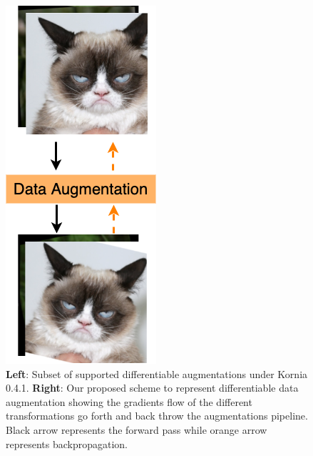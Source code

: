 \begin{figure}
\begin{minipage}[b]{0.25\linewidth}
    \includegraphics[width=.8\linewidth, right]{main/chapter03/data/dda/imgs/dda.png}
    \par\vspace{0pt}
  \end{minipage}%
\caption{{\bf Left}: Subset of supported differentiable augmentations under Kornia 0.4.1. {\bf Right}: Our proposed scheme to represent differentiable data augmentation showing the gradients flow of the different transformations go forth and back throw the augmentations pipeline. Black arrow represents the forward pass while orange arrow represents backpropagation.}
\label{fig:test}
\end{figure}

